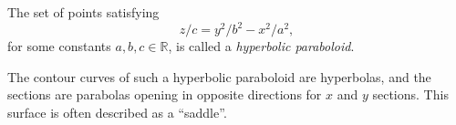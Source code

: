 \documentclass{ximera}
\begin{document}
\begin{example}
The set of points satisfying
\[
z/c = y^2/b^2 - x^2/a^2,
\]
for some constants $a,b,c\in\mathbb{R}$, is called a \emph{hyperbolic paraboloid}.

\begin{image}
\end{image}

The contour curves of such a hyperbolic paraboloid are hyperbolas, and the sections are parabolas opening in opposite directions for $x$ and $y$ sections. This surface is often described as a ``saddle''.
\end{example}
\end{document}
